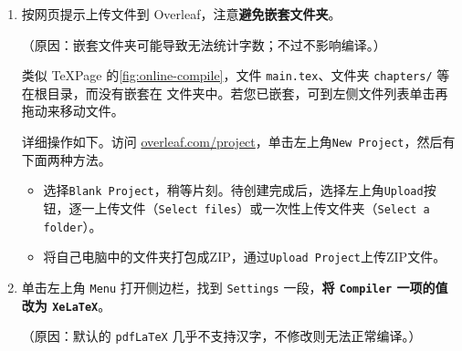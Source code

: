 \begin{enumerate}
  \item 按网页提示上传文件到 Overleaf，注意\textbf{避免嵌套文件夹}。

    （原因：嵌套文件夹可能导致无法统计字数；不过不影响编译。）

    类似 TeXPage 的\cref{fig:online-compile}，文件 \texttt{main.tex}、文件夹 \texttt{chapters/} 等在根目录，而没有嵌套在  文件夹中。若您已嵌套，可到左侧文件列表单击再拖动来移动文件。

    详细操作如下。访问 \href{https://cn.overleaf.com/project}{overleaf.com/project}，单击左上角\texttt{New Project}，然后有下面两种方法。

    \begin{itemize}
      \item 选择\texttt{Blank Project}，稍等片刻。待创建完成后，选择左上角\texttt{Upload}按钮，逐一上传文件（\texttt{Select files}）或一次性上传文件夹（\texttt{Select a folder}）。
      \item 将自己电脑中的文件夹打包成ZIP，通过\texttt{Upload Project}上传ZIP文件。
    \end{itemize}

  \item 单击左上角 \texttt{Menu} 打开侧边栏，找到 \texttt{Settings} 一段，\textbf{将 \texttt{Compiler} 一项的值改为 \texttt{XeLaTeX}}。

    （原因：默认的 \texttt{pdfLaTeX} 几乎不支持汉字，不修改则无法正常编译。）
\end{enumerate}

